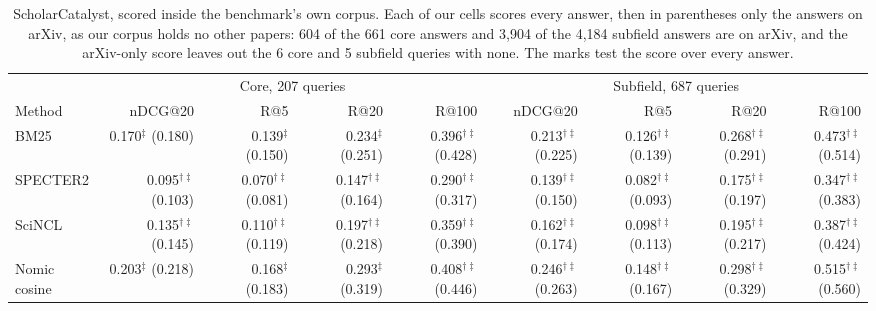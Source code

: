 \begin{table}[t]
\ContinuedFloat
\centering
\footnotesize
\setlength{\tabcolsep}{4pt}
\begin{subtable}{\textwidth}
\centering
\caption{ScholarCatalyst, scored inside the benchmark's own corpus. Each of our cells scores every answer, then in parentheses only the answers on arXiv, as our corpus holds no other papers: 604 of the 661 core answers and 3,904 of the 4,184 subfield answers are on arXiv, and the arXiv-only score leaves out the 6 core and 5 subfield queries with none. The marks test the score over every answer.}
\label{tab:scholarcatalyst}
\begin{tabular}{lrrrrrrrr}
\toprule
 & \multicolumn{4}{c}{Core, 207 queries} & \multicolumn{4}{c}{Subfield, 687 queries} \\
\cmidrule(lr){2-5}\cmidrule(lr){6-9}
Method & nDCG@20 & R@5 & R@20 & R@100 & nDCG@20 & R@5 & R@20 & R@100 \\
\midrule
BM25 & 0.170$^{\ddagger}$ (0.180) & 0.139$^{\ddagger}$ (0.150) & 0.234$^{\ddagger}$ (0.251) & 0.396$^{\dagger\ddagger}$ (0.428) & 0.213$^{\dagger\ddagger}$ (0.225) & 0.126$^{\dagger\ddagger}$ (0.139) & 0.268$^{\dagger\ddagger}$ (0.291) & 0.473$^{\dagger\ddagger}$ (0.514) \\
SPECTER2 & 0.095$^{\dagger\ddagger}$ (0.103) & 0.070$^{\dagger\ddagger}$ (0.081) & 0.147$^{\dagger\ddagger}$ (0.164) & 0.290$^{\dagger\ddagger}$ (0.317) & 0.139$^{\dagger\ddagger}$ (0.150) & 0.082$^{\dagger\ddagger}$ (0.093) & 0.175$^{\dagger\ddagger}$ (0.197) & 0.347$^{\dagger\ddagger}$ (0.383) \\
SciNCL & 0.135$^{\dagger\ddagger}$ (0.145) & 0.110$^{\dagger\ddagger}$ (0.119) & 0.197$^{\dagger\ddagger}$ (0.218) & 0.359$^{\dagger\ddagger}$ (0.390) & 0.162$^{\dagger\ddagger}$ (0.174) & 0.098$^{\dagger\ddagger}$ (0.113) & 0.195$^{\dagger\ddagger}$ (0.217) & 0.387$^{\dagger\ddagger}$ (0.424) \\
Nomic cosine & 0.203$^{\ddagger}$ (0.218) & 0.168$^{\ddagger}$ (0.183) & 0.293$^{\ddagger}$ (0.319) & 0.408$^{\dagger\ddagger}$ (0.446) & 0.246$^{\dagger\ddagger}$ (0.263) & 0.148$^{\dagger\ddagger}$ (0.167) & 0.298$^{\dagger\ddagger}$ (0.329) & 0.515$^{\dagger\ddagger}$ (0.560) \\

\end{tabular}
\end{subtable}
\end{table}
